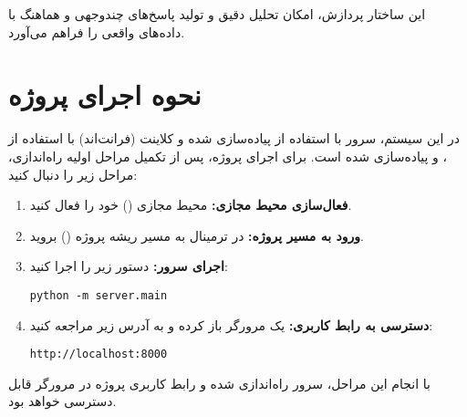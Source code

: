 \documentclass{article}
\begin{document}
این ساختار پردازش، امکان تحلیل دقیق و تولید پاسخ‌های چندوجهی و هماهنگ با داده‌های واقعی را فراهم می‌آورد.


\section{نحوه اجرای پروژه}
در این سیستم، سرور با استفاده از  پیاده‌سازی شده و کلاینت (فرانت‌اند) با استفاده از ،  و  پیاده‌سازی شده است.
برای اجرای پروژه، پس از تکمیل مراحل اولیه راه‌اندازی، مراحل زیر را دنبال کنید:

\begin{enumerate}
\item \textbf{فعال‌سازی محیط مجازی:} محیط مجازی () خود را فعال کنید.

\item \textbf{ورود به مسیر پروژه:} در ترمینال به مسیر ریشه پروژه () بروید.

\item \textbf{اجرای سرور:} دستور زیر را اجرا کنید:

\begin{latin}
\begin{lstlisting}
python -m server.main
\end{lstlisting}
\end{latin}

\item \textbf{دسترسی به رابط کاربری:} یک مرورگر باز کرده و به آدرس زیر مراجعه کنید:

\begin{latin}
\begin{lstlisting}
http://localhost:8000
\end{lstlisting}
\end{latin}
\end{enumerate}

با انجام این مراحل، سرور راه‌اندازی شده و رابط کاربری پروژه در مرورگر قابل دسترسی خواهد بود.
\end{document}
